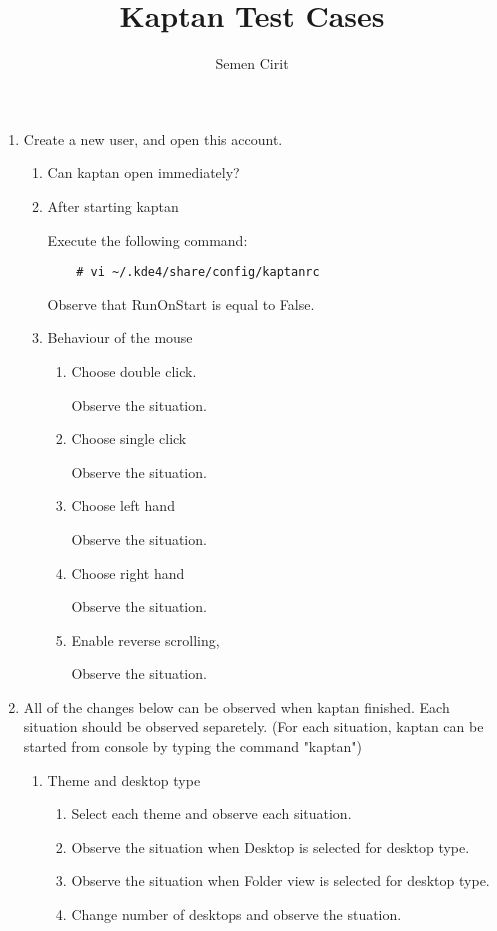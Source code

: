 \documentclass[a4paper,10pt]{article}
\title{Kaptan Test Cases}
\author{Semen Cirit}
\begin{document}
\maketitle

\begin{enumerate}

\item Create a new user, and open this account.
\begin{enumerate}
    \item Can kaptan open immediately?
    \item After starting kaptan

          Execute the following command:
\begin{verbatim}
    # vi ~/.kde4/share/config/kaptanrc
\end{verbatim} 
        Observe that RunOnStart is equal to False.

    \item Behaviour of the mouse
    \begin{enumerate}
        \item Choose double click.

            Observe the situation.
        \item Choose single click

            Observe the situation.

        \item Choose left hand

            Observe the situation.
        \item Choose right hand

            Observe the situation.

        \item Enable reverse scrolling,

            Observe the situation.
    \end{enumerate}
\end{enumerate}

\item All of the changes below can be observed when kaptan finished. Each situation should be observed separetely.
(For each situation, kaptan can be started from console by typing the command "kaptan")
    \begin{enumerate}
    \item Theme and desktop type
        \begin{enumerate}
        \item Select each theme and observe each situation.
        \item Observe the situation when Desktop is selected for desktop type.
        \item Observe the situation when  Folder view is selected for desktop type.
        \item Change number of desktops and observe the stuation.
        \end{enumerate}


\end{enumerate}
\end{enumerate}
\end{document}
